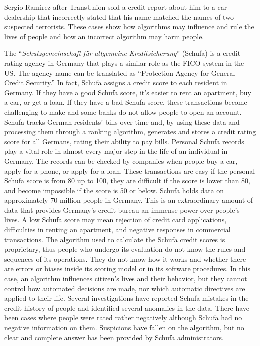 Sergio Ramirez after TransUnion sold a credit report about him to a car dealership that incorrectly stated that his name matched the names of two suspected terrorists. These cases show how algorithms may influence and rule the lives of people and how an incorrect algorithm may harm people.

The ``\textit{Schutzgemeinschaft} \textit{f\"{u}r} \textit{allgemeine} \textit{Kreditsicherung}'' (Schufa) is a credit rating agency in Germany that plays a similar role as the FICO system in the US. The agency name can be translated as ``Protection Agency for General Credit Security.'' In fact, Schufa assigns a credit score to each resident in Germany. If they have a good Schufa score, it's easier to rent an apartment, buy a car, or get a loan. If they have a bad Schufa score, these transactions become challenging to make and some banks do not allow people to open an account. Schufa tracks German residents' bills over time and, by using these data and processing them through a ranking algorithm, generates and stores a credit rating score for all Germans, rating their ability to pay bills. Personal Schufa records play a vital role in almost every major step in the life of an individual in Germany. The records can be checked by companies when people buy a car, apply for a phone, or apply for a loan. These transactions are easy if the personal Schufa score is from 80 up to 100, they are difficult if the score is lower than 80, and become impossible if the score is 50 or below. Schufa holds data on approximately 70 million people in Germany. This is an extraordinary amount of data that provides Germany's credit bureau an immense power over people's lives. A low Schufa score may mean rejection of credit card applications, difficulties in renting an apartment, and negative responses in commercial transactions. The algorithm used to calculate the Schufa credit scores is proprietary, thus people who undergo its evaluation do not know the rules and sequences of its operations. They do not know how it works and whether there are errors or biases inside its scoring model or in its software procedures. In this case, an algorithm influences citizen's lives and their behavior, but they cannot control how automated decisions are made, nor which automatic directives are applied to their life. Several investigations have reported Schufa mistakes in the credit history of people and identified several anomalies in the data. There have been cases where people were rated rather negatively although Schufa had no negative information on them. Suspicions have fallen on the algorithm, but no clear and complete answer has been provided by Schufa administrators.


